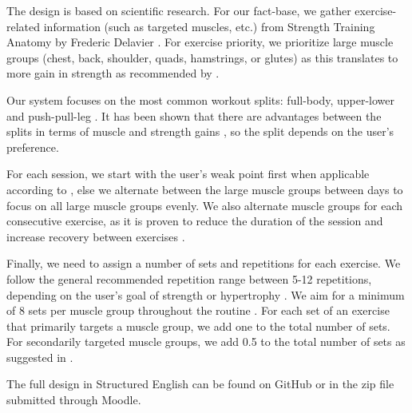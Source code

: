 \documentclass{article}      %
\begin{document}
The design is based on scientific research. For our fact-base, we gather exercise-related information (such as targeted muscles, etc.) from Strength Training Anatomy by Frederic Delavier \cite{delavier2005strength}. For exercise priority, we prioritize large muscle groups (chest, back, shoulder, quads, hamstrings, or glutes) as this translates to more gain in strength as recommended by \cite{exercise-priority}. 

Our system focuses on the most common workout splits: full-body, upper-lower and push-pull-leg \cite{workout-split}. It has been shown that there are advantages between the splits in terms of muscle and strength gains \cite{split-effect}, so the split depends on the user's preference.

For each session, we start with the user's weak point first when applicable according to \cite{exercise-priority}, else we alternate between the large muscle groups between days to focus on all large muscle groups evenly. We also alternate muscle groups for each consecutive exercise, as it is proven to reduce the duration of the session and increase recovery between exercises \cite{alternating-exercise}.

Finally, we need to assign a number of sets and repetitions for each exercise. We follow the general recommended repetition range between 5-12 repetitions, depending on the user's goal of strength or hypertrophy \cite{reps-per-set}. We aim for a minimum of 8 sets per muscle group throughout the routine \cite{sets-per-exercise}. For each set of an exercise that primarily targets a muscle group, we add one to the total number of sets. For secondarily targeted muscle groups, we add 0.5 to the total number of sets as suggested in \cite{set-count}.

The full design in Structured English can be found on GitHub or in the zip file submitted through Moodle.



\end{document}
